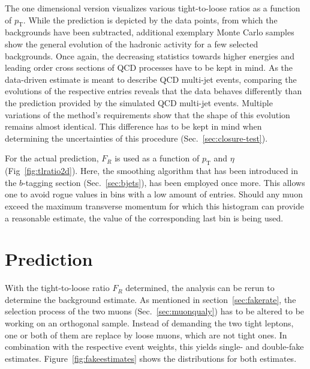 The one dimensional version visualizes various tight-to-loose ratios as a function of $p_{\text{T}}$. While the prediction is depicted by the data points, from which the backgrounds have been subtracted, additional exemplary Monte Carlo samples show the general evolution of the hadronic activity for a few selected backgrounds. Once again, the decreasing statistics towards higher energies and leading order cross sections of QCD processes have to be kept in mind. As the data-driven estimate is meant to describe QCD multi-jet events, comparing the evolutions of the respective entries reveals that the data behaves differently than the prediction provided by the simulated QCD multi-jet events. Multiple variations of the method's requirements show that the shape of this evolution remains almost identical. This difference has to be kept in mind when determining the uncertainties of this procedure (Sec.~\ref{sec:closure-test}).  

For the actual prediction, $F_R$ is used as a function of $p_{\text{T}}$ and $\eta$ (Fig~\ref{fig:tlratio2d}). Here, the smoothing algorithm that has been introduced in the $b$-tagging section (Sec.~\ref{sec:bjets}), has been employed once more. This allows one to avoid rogue values in bins with a low amount of entries. Should any muon exceed the maximum transverse momentum for which this histogram can provide a reasonable estimate, the value of the corresponding last bin is being used.

\section{Prediction}
\label{sec:tlprediction}

With the tight-to-loose ratio $F_R$ determined, the analysis can be rerun to determine the background estimate. As mentioned in section~\ref{sec:fakerate}, the selection process of the two muons (Sec.~\ref{sec:muonqualy}) has to be altered to be working on an orthogonal sample. Instead of demanding the two tight leptons, one or both of them are replace by loose muons, which are not tight ones. In combination with the respective event weights, this yields single- and double-fake estimates. Figure~\ref{fig:fakeestimates} shows the distributions for both estimates.

